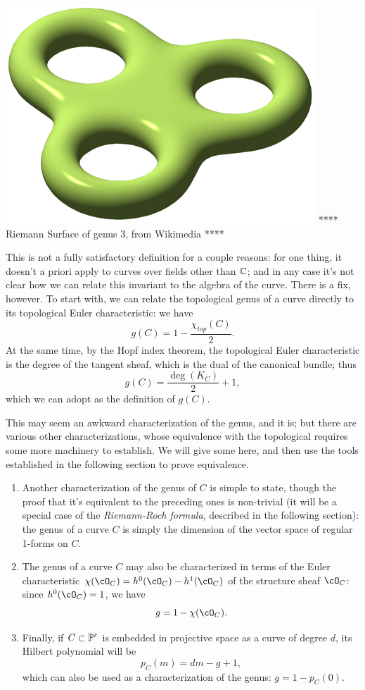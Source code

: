 \includegraphics[scale = 1]{RiemannSurface}
**** Riemann Surface of genus 3, from Wikimedia ****

This is not a fully satisfactory definition for a couple reasons: for one thing, it doesn't a priori apply to curves over fields other than $\CC$; and in any case it's not clear how we can relate this invariant to the algebra of the curve. There is a fix, however. To start with, we can relate the topological genus of a curve directly to its topological Euler characteristic: we have
$$
g(C) = 1 - \frac{\chi_{top}(C)}{2}.
$$
At the same time, by the Hopf index theorem, the topological Euler characteristic is the degree of the tangent sheaf, which is the dual of the canonical bundle; thus
$$
g(C) = \frac{\deg(K_C)}{2} + 1,
$$
which we can adopt as the definition of $g(C)$.

This may seem an awkward characterization of the genus, and it is; but there are various other characterizations, whose equivalence with the topological requires some more machinery to establish. We will give some here, and then use the tools established in the following section to prove equivalence.

\begin{enumerate}

\item\label{genus 1forms} Another characterization of the genus of $C$ is simple to state, though the proof that it's equivalent to the preceding ones is non-trivial (it will be a special case of the \emph{Riemann-Roch formula}, described in the following section): the genus of a curve $C$ is simply the dimension of the vector space of regular 1-forms on $C$.

\item The genus of a curve $C$ may also be characterized in terms of the Euler characteristic $\chi(\cO_C) = h^0(\cO_C) - h^1(\cO_C)$ of the structure sheaf $\cO_C$: since $h^0(\cO_C) = 1$, we have
$$
g = 1 - \chi(\cO_C).
$$

\item\label{genus Hilbert} Finally, if $C \subset \PP^r$ is embedded in projective space as a curve of degree $d$, its Hilbert polynomial will be
$$
p_C(m) = dm - g + 1,
$$
which can also be used as a characterization of the genus: $g = 1 - p_C(0)$.

\end{enumerate}


